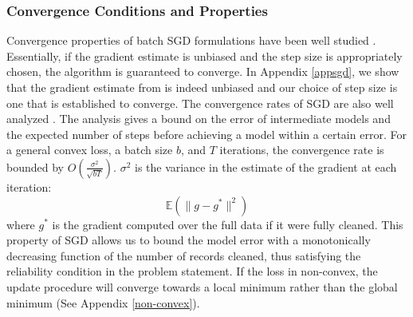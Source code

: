 \subsubsection{Convergence Conditions and Properties}
Convergence properties of batch SGD formulations have been well studied \cite{dekel2012optimal}. Essentially, if the gradient estimate is unbiased and the step size is appropriately chosen, the algorithm is guaranteed to converge. 
In Appendix \ref{appsgd}, we show that the gradient estimate from \sys is indeed unbiased and our choice of step size is one that is established to converge.
The convergence rates of SGD are also well analyzed \cite{dekel2012optimal,bertsekas2011incremental,zhao2014stochastic}. 
The analysis gives a bound on the error of intermediate models and the expected number of steps before achieving a model within a certain error. 
For a general convex loss, a batch size $b$, and $T$ iterations, the convergence rate is bounded by $O(\frac{\sigma^2}{\sqrt{bT}})$. 
$\sigma^2$ is the variance in the estimate of the gradient at each iteration:
\[
\mathbb{E}(\|g - g^*\|^2)
\]
where $g^*$ is the gradient computed over the full data if it were fully cleaned.
This property of SGD allows us to bound the model error with a monotonically decreasing function of the number of records cleaned, thus satisfying the reliability condition in the problem statement.
If the loss in non-convex, the update procedure will converge towards a local minimum rather than the global minimum (See Appendix \ref{non-convex}).

